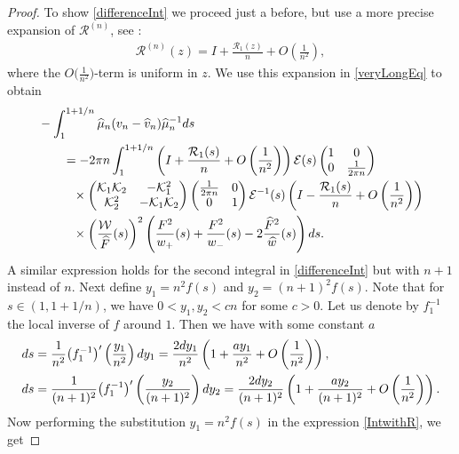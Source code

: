 \documentclass[11pt]{article}
\numberwithin{equation}{section}
\newcommand{\Id}{I}
\newcommand{\cK}{\mathcal{K}}
\newcommand{\cE}{\mathcal{E}}
\newcommand{\cR}{\mathcal{R}}
\newcommand{\cW}{\mathcal{W}}
\newcommand{\hw}{\widehat w}
\newcommand{\hmu}{{\widehat \mu}}
\newcommand{\bv}{v}
\newcommand{\hv}{{\widehat v}}
\newcommand{\hF}{\widehat F}
\newcommand{\hFw}{\frac{\hF^2}{\hw}}
\numberwithin{equation}{section}
\begin{document}
\begin{proof}
To show \eqref{differenceInt} we proceed just a before, but use a more precise expansion of $\cR^{(n)}$, see \cite[equation~(8.7)]{KMVV}:
\begin{align*}
 \cR^{(n)}(z) = \Id + \frac{\cR_1(z)}{n} + O\left(\frac{1}{n^2}\right),
\end{align*}
where the $O\big(\frac{1}{n^2}\big)$-term is uniform in $z$.
We use this expansion in \eqref{veryLongEq} to obtain
\begin{align}
 &-\int_1^{1+1/n} \hmu_n(\bv_n-\hv_n)\hmu_n^{-1} {\rm d}s\nonumber
 \\
 &\qquad= -2\pi n \int_1^{1+1/n} \left( \Id + \frac{\cR_1(s)}{n}+ O\left( \frac{1}{n^2} \right)\right)\cE(s)
 \begin{pmatrix}
 1 & 0
 \\
 0 & \frac{1}{2\pi n}
 \end{pmatrix}\nonumber
 \\
 &\phantom{\qquad= }{}\times \begin{pmatrix}
 \cK_1\cK_2 & -\cK^2_1
 \\
 \cK^2_2 & -\cK_1\cK_2
 \end{pmatrix}
 \begin{pmatrix}
 \frac{1}{2\pi n} & 0
 \\
 0 & 1
 \end{pmatrix}\cE^{-1}(s)\left( \Id - \frac{\cR_1(s)}{n}+ O\left( \frac{1}{n^2} \right)\right)\nonumber
 \\
 &\phantom{\qquad= }{}\times \left(\frac{\cW}{\hF}(s)\right)^2\left(\frac{F^2}{w_+}(s)+\frac{F^2}{w_-}(s)-2\hFw(s)\right) {\rm d}s.\label{IntwithR}
\end{align}
A similar expression holds for the second integral in \eqref{differenceInt} but with $n+1$ instead of $n$. Next define $y_1 = n^2f(s)$ and $y_2 = (n+1)^2f(s)$. Note that for $s \in (1,1+1/n)$, we have $0<y_1, y_2 < cn$ for some $c > 0$. Let us denote by $f_1^{-1}$ the local inverse of $f$ around $1$. Then we have with some constant $a$
\begin{align*}
 {\rm d}s &= \frac{1}{n^2}\big(f_1^{-1}\big)'\left(\frac{y_1}{n^2}\right) {\rm d}y_1 = \frac{2{\rm d}y_1}{n^2}\left(1 + \frac{ay_1}{n^2} + O\left(\frac{1}{n^2}\right)\right),
 \\
 {\rm d}s &= \frac{1}{(n+1)^2}\big(f_1^{-1}\big)'\left(\frac{y_2}{(n+1)^2}\right) {\rm d}y_2 = \frac{2{\rm d}y_2}{(n+1)^2}\left(1 + \frac{ay_2}{(n+1)^2} + O\left(\frac{1}{n^2}\right)\right).
\end{align*}
Now performing the substitution $y_1 = n^2f(s)$ in the expression \eqref{IntwithR}, we get

\end{proof}
\end{document}
